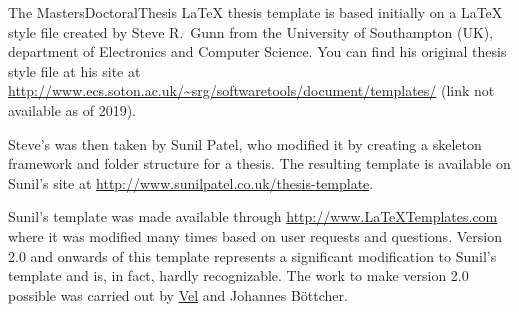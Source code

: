 The MastersDoctoralThesis LaTeX thesis template is based initially on a LaTeX style file created by Steve R.\ Gunn from the University of Southampton (UK), department of Electronics and Computer Science. You can find his original thesis style file at his site at
\url{http://www.ecs.soton.ac.uk/~srg/softwaretools/document/templates/} (link not available as of 2019).

Steve's  was then taken by Sunil Patel, who modified it by creating a skeleton framework and folder structure for a thesis. The resulting template is available on Sunil's site at
\url{http://www.sunilpatel.co.uk/thesis-template}.

Sunil's template was made available through \url{http://www.LaTeXTemplates.com} where it was modified many times based on user requests and questions. Version 2.0 and onwards of this template represents a significant modification to Sunil's template and is, in fact, hardly recognizable. The work to make version 2.0 possible was carried out by \href{mailto:vel@latextemplates.com}{Vel} and Johannes Böttcher.
